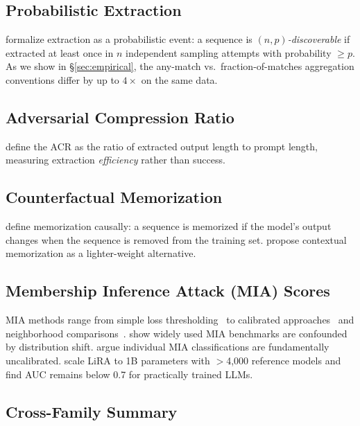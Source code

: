 \documentclass[11pt]{article}
\begin{document}
\subsection{Probabilistic Extraction}

\citet{hayes2025measuringmemorizationlanguagemodels} formalize extraction as
a probabilistic event: a sequence is \textit{$(n,p)$-discoverable} if
extracted at least once in $n$ independent sampling attempts with probability
$\geq p$.
As we show in \S\ref{sec:empirical}, the any-match vs.\ fraction-of-matches
aggregation conventions differ by up to $4\times$ on the same data.

\subsection{Adversarial Compression Ratio}

\citet{schwarzschild2024rethinking} define the ACR as the ratio of extracted
output length to prompt length, measuring extraction \textit{efficiency} rather
than success.

\subsection{Counterfactual Memorization}

\citet{zhang2023counterfactual} define memorization causally: a sequence is
memorized if the model's output changes when the sequence is removed from the
training set.
\citet{ghosh2025rethinkingmemorizationmeasuresimplications} propose contextual
memorization as a lighter-weight alternative.

\subsection{Membership Inference Attack (MIA) Scores}

MIA methods range from simple loss thresholding~\citep{yeom2018privacy} to
calibrated approaches~\citep{carlini2022membership} and neighborhood
comparisons~\citep{mattern2023membership}.
\citet{meeus2025sok} show widely used MIA benchmarks are confounded by
distribution shift.
\citet{zhang2025membershipinferenceattacksprove} argue individual MIA
classifications are fundamentally uncalibrated.
\citet{hayes2026exploringlimitsstrongmembership} scale LiRA to 1B parameters
with $>$4{,}000 reference models and find AUC remains below 0.7 for
practically trained LLMs.

\subsection{Cross-Family Summary}
\end{document}

